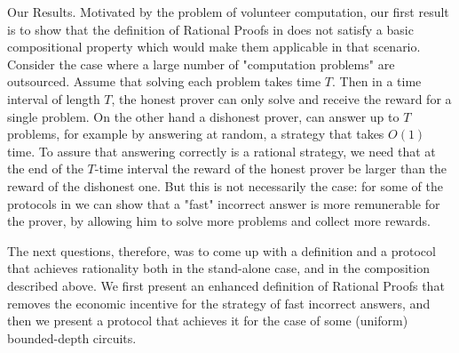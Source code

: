 \smallskip
\noindent
{\sc Our Results.} 
Motivated by the problem of volunteer computation, our first
result is to show that the definition of Rational Proofs in \cite{am,am1} does not satisfy a basic compositional property which would make them applicable 
in that scenario. 
Consider the case where a large number of "computation problems" are outsourced. Assume that solving each problem takes time $T$. Then in a time interval of length $T$, the honest prover can only solve and receive the reward for a single problem. On the other hand a dishonest prover, can answer up to $T$ problems, for example by answering at random, a strategy that takes $O(1)$ time. To assure that answering correctly is a rational strategy, we 
need that at the end of the $T$-time interval the reward of the honest prover be larger than the reward of the dishonest one. But this is not necessarily the case: for some of the protocols in \cite{am,am1,rosen} we can show that a "fast" incorrect answer is more remunerable for the prover, by allowing him to solve more problems and collect more rewards.

The next questions, therefore, was to come up with a definition and a protocol that achieves rationality both in the stand-alone case, and in the composition
described above.  We first present an enhanced definition of Rational Proofs that removes the economic incentive  for the strategy of fast incorrect answers, and then we present a protocol that achieves it for the case of some (uniform) bounded-depth circuits.
 
